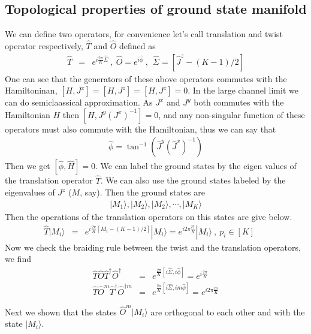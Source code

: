 \documentclass[reprint,prb,superscriptaddress]{revtex4-2}
\begin{document}
\subsection{Topological properties of ground state manifold}
\noindent  We can define two operators, for convenience let's call translation and twist operator respectively, $\hat{T}$ and $\hat{O}$ defined as 
\begin{eqnarray}
\hat{T} &=& e^{i\frac{2\pi}{K} \hat{\Sigma}} ~,~\hat{O} = e^{i\hat{\phi}}~,~~\hat{\Sigma}=[\hat{J}^z-(K-1)/2]
\end{eqnarray}
One can see that the generators of these above operators commutes with the Hamiltoninan, $[H,J^x]=[H,J^z]=[H,J^z]=0$. In the large channel limit we can do semiclaassical approximation. As $J^x$ and $J^y$ both commutes with the Hamiltonian $H$ then $[H,J^y{(J^{x})}^{-1}]=0$, and any non-singular function of these operators must also commute with the Hamiltonian, thus we can say that
\begin{eqnarray}
\hat{\phi}=\tan^{-1}(\hat{J}^y(\hat{J}^x)^{-1})
\end{eqnarray}
Then we get $[\hat{\phi},\hat{H}]=0$. We can label the ground states by the eigen values of the translation operator $\hat{T}$. We can also use the ground states labeled by the eigenvalues of $J^z$ ($M$, say). Then the ground states are 
\begin{eqnarray}
|M_1\rangle,|M_2\rangle,|M_2\rangle,\cdots ,|M_K\rangle
\end{eqnarray}
Then the operations of the translation operators on this states are give below.
\begin{eqnarray}
\hat{T}|M_i\rangle &=& e^{i\frac{2\pi}{K} [M_i-(K-1)/2]} |M_i\rangle = e^{i2\pi\frac{p_i}{K} } |M_i\rangle~,~p_i\in[K]~~~~~~~
\end{eqnarray}
Now we check the braiding rule between the twist and the translation operators, we find
\begin{eqnarray}
\hat{T}\hat{O}\hat{T}^{\dagger}\hat{O}^{\dagger} &=& e^{\frac{2\pi }{K}[i\hat{\Sigma},i\hat{\phi}]}=e^{i\frac{2\pi }{K}} \nonumber\\
\hat{T}\hat{O}^m\hat{T}^{\dagger}\hat{O}^{\dagger m} &=& e^{\frac{2\pi }{K}[i\hat{\Sigma},im\hat{\phi}]}=e^{i2\pi \frac{m}{K}}
\end{eqnarray}

Next we shown that the states $\hat{O}^m |M_i\rangle$ are orthogonal to each other and with the state $|M_i\rangle$.
\end{document}
